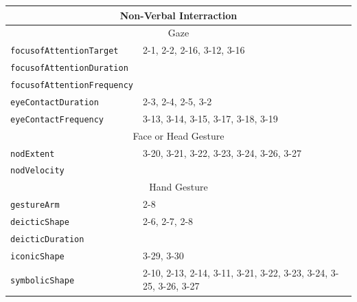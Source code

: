 \documentclass{CSSRforAfrica}
\begin{document}
\begin{table}[H]
\begin{center}
\begin{tabular}{|l l|}
\multicolumn{2}{|c|}{{\footnotesize \bf Non-Verbal Interraction}} \\
\hline
\multicolumn{2}{|c|}{{\footnotesize Gaze}} \\
\hline
{\footnotesize \verb+focusofAttentionTarget+} 	    & {\footnotesize 2-1, 2-2, 2-16, 3-12, 3-16} \vspace{-1mm}\\
{\footnotesize \verb+focusofAttentionDuration+}     & {\footnotesize \verb++} \vspace{-1mm}\\
{\footnotesize \verb+focusofAttentionFrequency+}   & {\footnotesize \verb++} \vspace{-1mm}\\
{\footnotesize \verb+eyeContactDuration+} 	            & {\footnotesize 2-3, 2-4, 2-5, 3-2 } \vspace{-1mm}\\
{\footnotesize \verb+eyeContactFrequency+} 	    & {\footnotesize 3-13, 3-14, 3-15, 3-17, 3-18, 3-19 } \\
\hline
\multicolumn{2}{|c|}{{\footnotesize Face or Head Gesture}} \\
\hline
{\footnotesize \verb+nodExtent+} 	                           & {\footnotesize 3-20, 3-21, 3-22, 3-23, 3-24, 3-26, 3-27 }\vspace{-1mm} \\
{\footnotesize \verb+nodVelocity+} 	                   & {\footnotesize  }\\
\hline
\multicolumn{2}{|c|}{{\footnotesize Hand Gesture}} \\
\hline
{\footnotesize \verb+gestureArm+} 	                 & {\footnotesize 2-8 } \vspace{-1mm}\\
{\footnotesize \verb+deicticShape+} 	                 & {\footnotesize 2-6, 2-7, 2-8 } \vspace{-1mm}\\
{\footnotesize \verb+deicticDuration+} 	                 & {\footnotesize \verb++} \vspace{-1mm}\\
{\footnotesize \verb+iconicShape+} 	                 & {\footnotesize 3-29, 3-30  } \vspace{-1mm}\\
{\footnotesize \verb+symbolicShape+} 	                 & {\footnotesize 2-10, 2-13, 2-14, 3-11, 3-21, 3-22, 3-23, 3-24, 3-25, 3-26, 3-27  }\vspace{-1mm} \\

\end{tabular}
\end{center}
\end{table}
\end{document}
